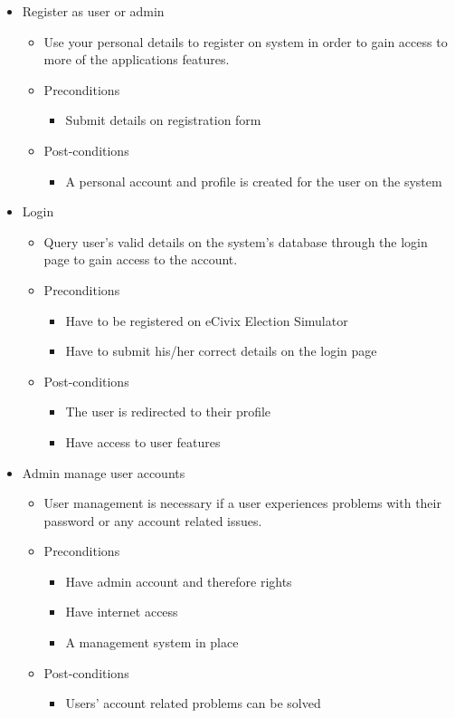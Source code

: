 \documentclass{article}
\begin{document}
   		 \begin{itemize}
    				\item Register as user or admin
				\begin{itemize}
					\item Use your personal details to register on system in order to gain access to more of the applications features.

					\item Preconditions
					\begin{itemize}
						\item Submit details on registration form
					\end{itemize}
					\item Post-conditions
					\begin{itemize}
						\item A personal account and profile is created for the user on the system
					\end{itemize}
				\end{itemize}
				
				\item Login
				\begin{itemize}
					\item Query user’s valid details on the system’s database through the login page to gain access to the account. 
					\item Preconditions
					\begin{itemize}
						\item Have to be registered on eCivix Election Simulator
						\item Have to submit his/her correct details on the login page
					\end{itemize}
					\item Post-conditions
					\begin{itemize}
						\item The user is redirected to their profile
						\item Have access to user features
					\end{itemize}
				\end{itemize}
				
				\item Admin manage user accounts
				\begin{itemize}
					\item User management is necessary if a user experiences problems with their password or any account related issues.
					\item Preconditions
					\begin{itemize}
						\item Have admin account and therefore rights
						\item Have internet access
						\item A management system in place
					\end{itemize}
					\item Post-conditions
					\begin{itemize}
						\item Users’ account related problems can be solved
					\end{itemize}
                \end{itemize}
           

\end{itemize}
\end{document}
